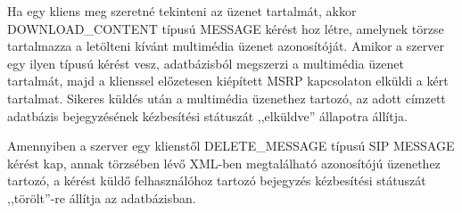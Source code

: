 Ha egy kliens meg szeretné tekinteni az üzenet tartalmát, akkor DOWNLOAD\_CONTENT típusú MESSAGE kérést hoz létre, amelynek törzse tartalmazza a letölteni kívánt multimédia üzenet azonosítóját. Amikor a szerver egy ilyen típusú kérést vesz, adatbázisból megszerzi a multimédia üzenet tartalmát, majd a klienssel előzetesen kiépített MSRP kapcsolaton elküldi a kért tartalmat. Sikeres küldés után a multimédia üzenethez tartozó, az adott címzett adatbázis bejegyzésének kézbesítési státuszát ,,elküldve'' állapotra állítja.

Amennyiben a szerver egy klienstől DELETE\_MESSAGE típusú SIP MESSAGE kérést kap, annak törzsében lévő XML-ben megtalálható azonosítójú üzenethez tartozó, a kérést küldő felhasználóhoz tartozó bejegyzés kézbesítési státuszát ,,törölt''-re állítja az adatbázisban.  